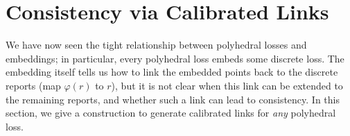 \documentclass[12pt]{article}
\newcommand{\Comments}{1}
\newcommand{\mynote}[2]{\ifnum\Comments=1\textcolor{#1}{#2}\fi}
\newcommand{\raf}[1]{\mynote{green}{[RF: #1]}}
\newtheorem{corollary}{Corollary}
\begin{document}


\section{Consistency via Calibrated Links}
\label{sec:calibration}

We have now seen the tight relationship between polyhedral losses and embeddings; in particular, every polyhedral loss embeds some discrete loss.
The embedding itself tells us how to link the embedded points back to the discrete reports (map $\varphi(r)$ to $r$), but it is not clear when this link can be extended to the remaining reports, and whether such a link can lead to consistency.
In this section, we give a construction to generate calibrated links for \emph{any} polyhedral loss.
\end{document}
